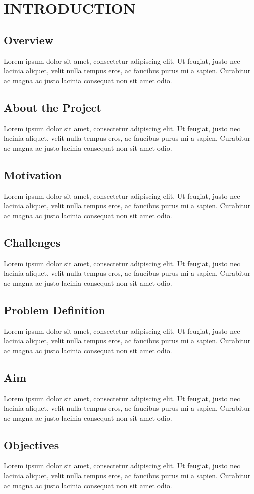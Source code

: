 \chapter{INTRODUCTION}

\section{Overview}
Lorem ipsum dolor sit amet, consectetur adipiscing elit. Ut feugiat, justo nec lacinia aliquet, velit nulla tempus eros, ac faucibus purus mi a sapien. Curabitur ac magna ac justo lacinia consequat non sit amet odio.

\section{About the Project}
Lorem ipsum dolor sit amet, consectetur adipiscing elit. Ut feugiat, justo nec lacinia aliquet, velit nulla tempus eros, ac faucibus purus mi a sapien. Curabitur ac magna ac justo lacinia consequat non sit amet odio.

\section{Motivation}
Lorem ipsum dolor sit amet, consectetur adipiscing elit. Ut feugiat, justo nec lacinia aliquet, velit nulla tempus eros, ac faucibus purus mi a sapien. Curabitur ac magna ac justo lacinia consequat non sit amet odio.


\section{Challenges}
Lorem ipsum dolor sit amet, consectetur adipiscing elit. Ut feugiat, justo nec lacinia aliquet, velit nulla tempus eros, ac faucibus purus mi a sapien. Curabitur ac magna ac justo lacinia consequat non sit amet odio.


\section{Problem Definition}
Lorem ipsum dolor sit amet, consectetur adipiscing elit. Ut feugiat, justo nec lacinia aliquet, velit nulla tempus eros, ac faucibus purus mi a sapien. Curabitur ac magna ac justo lacinia consequat non sit amet odio.

\section{Aim}
Lorem ipsum dolor sit amet, consectetur adipiscing elit. Ut feugiat, justo nec lacinia aliquet, velit nulla tempus eros, ac faucibus purus mi a sapien. Curabitur ac magna ac justo lacinia consequat non sit amet odio.

\section{Objectives}
Lorem ipsum dolor sit amet, consectetur adipiscing elit. Ut feugiat, justo nec lacinia aliquet, velit nulla tempus eros, ac faucibus purus mi a sapien. Curabitur ac magna ac justo lacinia consequat non sit amet odio.
